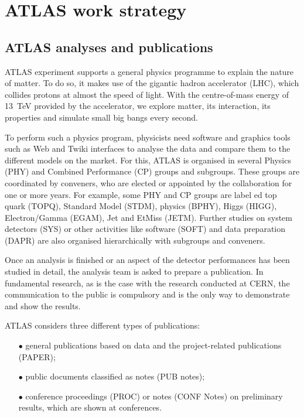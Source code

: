 
\section{ATLAS work strategy}%
\label{sec:ATLAS_work_strategy}

\subsection{ATLAS analyses and publications}%
\label{sec:The_ATLAS_Analyses_and_Publications}

ATLAS experiment supports a  general physics programme to explain the nature of matter. To do so,  it makes use of the gigantic hadron accelerator (LHC), which collides protons at almost the speed of light. With the centre-of-mass energy of \SI{13}{\TeV} provided by the accelerator, we explore matter, its interaction, its properties and simulate small big bangs every second.

To perform such a physics program, physicists need software and graphics tools such as Web and Twiki interfaces to analyse the data and compare them to the different models on the market.
For this, ATLAS is organised in several Physics (PHY) and  Combined Performance (CP) groups and subgroups. These groups are coordinated by conveners, who are elected or appointed by the collaboration for one or more years.
For example, some  PHY and CP groups are label ed top quark (TOPQ), Standard Model (STDM), \PB physics (BPHY), Higgs (HIGG), Electron/Gamma (EGAM), Jet and EtMiss (JETM).
Further studies on system detectors (SYS) or other activities like software (SOFT) and data preparation (DAPR) are also organised hierarchically with subgroups and conveners.

Once an analysis is finished or an aspect of the detector performances has been studied in detail,
the analysis team is asked to prepare a publication.
In fundamental research, as is the case with the research conducted at CERN, the communication to the public is  compulsory and is the only way to demonstrate and show the results.

ATLAS considers three different types of publications:
\begin{itemize}
    \item[\tiny$\bullet$] general publications based on data and the project-related publications (PAPER);
    \item[\tiny$\bullet$] public documents classified as notes (PUB notes);
    \item[\tiny$\bullet$] conference proceedings (PROC) or notes (CONF Notes) on preliminary results, which are shown at conferences.
\end{itemize}

